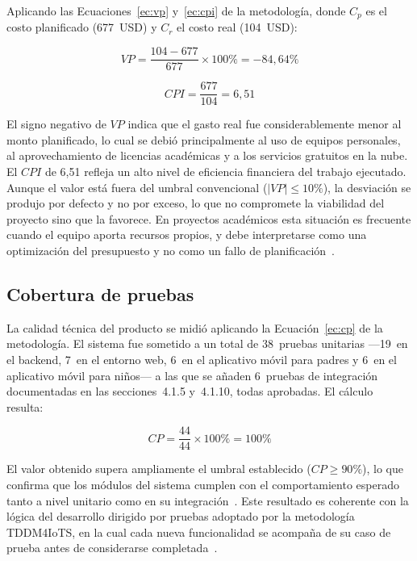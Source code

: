 				Aplicando las Ecuaciones~\eqref{ec:vp} y~\eqref{ec:cpi} de la metodología, donde $C_p$ es el costo planificado (677~USD) y $C_r$ el costo real (104~USD):
				
				\begin{equation}
					VP = \frac{104 - 677}{677} \times 100\% = -84{,}64\%
				\end{equation}
				
				\begin{equation}
					CPI = \frac{677}{104} = 6{,}51
				\end{equation}
				
				El signo negativo de $VP$ indica que el gasto real fue considerablemente menor al monto planificado, lo cual se debió principalmente al uso de equipos personales, al aprovechamiento de licencias académicas y a los servicios gratuitos en la nube. El $CPI$ de 6{,}51 refleja un alto nivel de eficiencia financiera del trabajo ejecutado. Aunque el valor está fuera del umbral convencional ($|VP| \leq 10\%$), la desviación se produjo por defecto y no por exceso, lo que no compromete la viabilidad del proyecto sino que la favorece. En proyectos académicos esta situación es frecuente cuando el equipo aporta recursos propios, y debe interpretarse como una optimización del presupuesto y no como un fallo de planificación~\cite{GuerreroUlloa2024,Wen2023}.
				
			\subsection{Cobertura de pruebas}
			\label{subsec:cpruebas}
				La calidad técnica del producto se midió aplicando la Ecuación~\eqref{ec:cp} de la metodología. El sistema fue sometido a un total de 38~pruebas unitarias —19~en el backend, 7~en el entorno web, 6~en el aplicativo móvil para padres y 6~en el aplicativo móvil para niños— a las que se añaden 6~pruebas de integración documentadas en las secciones~4.1.5 y~4.1.10, todas aprobadas. El cálculo resulta:
				
				\begin{equation}
					CP = \frac{44}{44} \times 100\% = 100\%
				\end{equation}
				
				El valor obtenido supera ampliamente el umbral establecido ($CP \geq 90\%$), lo que confirma que los módulos del sistema cumplen con el comportamiento esperado tanto a nivel unitario como en su integración~\cite{Pressman2019}. Este resultado es coherente con la lógica del desarrollo dirigido por pruebas adoptado por la metodología TDDM4IoTS, en la cual cada nueva funcionalidad se acompaña de su caso de prueba antes de considerarse completada~\cite{GuerreroUlloa2024}.
			
